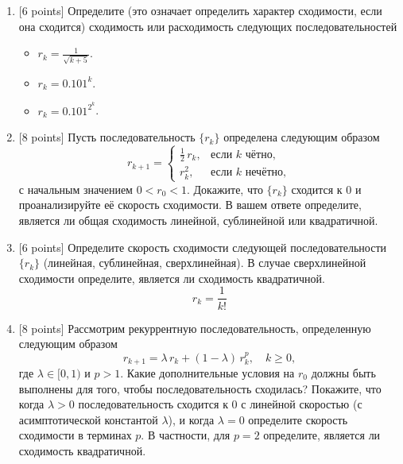 \documentclass[
  russian,
  letterpaper,
  DIV=11,
  numbers=noendperiod]{scrartcl}
\providecommand{\tightlist}{%
  \setlength{\itemsep}{0pt}\setlength{\parskip}{0pt}}
\begin{document}
\begin{enumerate}
\def\labelenumi{\arabic{enumi}.}
\item
  {[}6 points{]} Определите (это означает определить характер
  сходимости, если она сходится) сходимость или расходимость следующих
  последовательностей

  \begin{itemize}
  \tightlist
  \item
    \(r_{k} = \frac{1}{\sqrt{k+5}}\).
  \item
    \(r_{k} = 0.101^k\).
  \item
    \(r_{k} = 0.101^{2^k}\).
  \end{itemize}
\item
  {[}8 points{]} Пусть последовательность \(\{r_k\}\) определена
  следующим образом \[
   r_{k+1} = 
   \begin{cases}
   \frac{1}{2}\,r_k, & \text{если } k \text{ чётно}, \\
   r_k^2, & \text{если } k \text{ нечётно},
   \end{cases}
   \] с начальным значением \(0 < r_0 < 1\). Докажите, что \(\{r_k\}\)
  сходится к 0 и проанализируйте её скорость сходимости. В вашем ответе
  определите, является ли общая сходимость линейной, сублинейной или
  квадратичной.
\item
  {[}6 points{]} Определите скорость сходимости следующей
  последовательности \(\{r_k\}\) (линейная, сублинейная, сверхлинейная).
  В случае сверхлинейной сходимости определите, является ли сходимость
  квадратичной. \[
   r_k = \dfrac{1}{k!}
   \]
\item
  {[}8 points{]} Рассмотрим рекуррентную последовательность,
  определенную следующим образом \[
   r_{k+1} = \lambda\,r_k + (1-\lambda)\,r_k^p,\quad k\ge0,
   \] где \(\lambda\in [0,1)\) и \(p>1\). Какие дополнительные условия
  на \(r_0\) должны быть выполнены для того, чтобы последовательность
  сходилась? Покажите, что когда \(\lambda>0\) последовательность
  сходится к 0 с линейной скоростью (с асимптотической константой
  \(\lambda\)), и когда \(\lambda=0\) определите скорость сходимости в
  терминах \(p\). В частности, для \(p=2\) определите, является ли
  сходимость квадратичной.
\end{enumerate}
\end{document}
